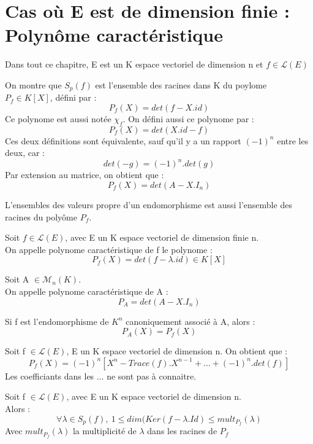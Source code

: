 \section{Cas où E est de dimension finie : Polynôme caractéristique}
Dans tout ce chapitre, E est un K espace vectoriel de dimension n et $f \in \mathcal{L}(E)$
\begin{prop}
On montre que $S_p(f)$ est l'ensemble des racines dans K du poylome $P_f \in K[X]$, défini par :
$$P_f(X) = det(f-X.id)$$
Ce polynome est aussi notée $\chi_f$. On défini aussi ce polynome par : 
$$P_f(X) = det(X.id-f)$$
Ces deux définitions sont équivalente, sauf qu'il y a un rapport $(-1)^n$ entre les deux, car : 
$$det(-g) = (-1)^n.det(g)$$
Par extension au matrice, on obtient que :
$$P_f(X) = det(A-X.I_n)$$
\end{prop}
\begin{prop}
L'ensembles des valeurs propre d'un endomorphisme est aussi l'ensemble des racines du polyôme $P_f$.
\end{prop}
\begin{de}
Soit $f \in \mathcal{L}(E)$, avec E un K espace vectoriel de dimension finie n.\\
On appelle polynome caractéristique de f le polynome : 
$$P_f(X) = det(f-\lambda.id) \in K[X]$$ 
\end{de}
\begin{de}
Soit A $\in \mathcal{M}_n(K)$.\\
On appelle polynome caractéristique de A : 
$$P_A = det (A - X.I_n)$$
\end{de}
\begin{prop}
Si f est l'endomorphisme de $K^n$ canoniquement associé à A, alors : 
$$P_A(X) = P_f(X)$$
\end{prop}
\begin{prop}
Soit f $\in \mathcal{L}(E)$, E un K espace vectoriel de dimension n. On obtient que : 
$$P_f(X) = (-1)^n\left[X^n-Trace(f).X^{n-1}+\dots+(-1)^n.det(f)\right] $$
Les coefficiants dans les $\dots$ ne sont pas à connaitre.
\end{prop}
\begin{theo}
Soit f $\in \mathcal{L}(E)$, avec E un K espace vectoriel de dimension n.\\
Alors : 
$$\forall \lambda \in S_p(f),~ 1\leq dim(Ker(f-\lambda.Id) \leq mult_{P_f}(\lambda)$$
Avec $mult_{P_f}(\lambda)$ la multiplicité de $\lambda$ dans les racines de $P_f$
\end{theo}
